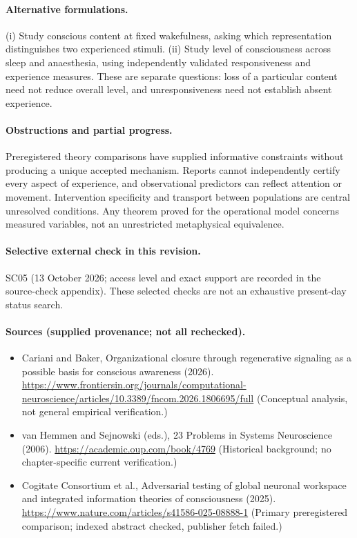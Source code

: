 \documentclass[11pt]{article}
\begin{document}
\paragraph{Alternative formulations.} (i) Study conscious content at fixed wakefulness, asking which representation distinguishes two experienced stimuli. (ii) Study level of consciousness across sleep and anaesthesia, using independently validated responsiveness and experience measures. These are separate questions: loss of a particular content need not reduce overall level, and unresponsiveness need not establish absent experience.
\paragraph{Obstructions and partial progress.} Preregistered theory comparisons have supplied informative constraints without producing a unique accepted mechanism. Reports cannot independently certify every aspect of experience, and observational predictors can reflect attention or movement. Intervention specificity and transport between populations are central unresolved conditions. Any theorem proved for the operational model concerns measured variables, not an unrestricted metaphysical equivalence.
\paragraph{Selective external check in this revision.} SC05 (13 October 2026; access level and exact support are recorded in the source-check appendix). These selected checks are not an exhaustive present-day status search.

\paragraph{Sources (supplied provenance; not all rechecked).} \begin{itemize}
\item Cariani and Baker, Organizational closure through regenerative signaling as a possible basis for conscious awareness (2026). \url{https://www.frontiersin.org/journals/computational-neuroscience/articles/10.3389/fncom.2026.1806695/full} (Conceptual analysis, not general empirical verification.)
\item van Hemmen and Sejnowski (eds.), 23 Problems in Systems Neuroscience (2006). \url{https://academic.oup.com/book/4769} (Historical background; no chapter-specific current verification.)
\item Cogitate Consortium et al., Adversarial testing of global neuronal workspace and integrated information theories of consciousness (2025). \url{https://www.nature.com/articles/s41586-025-08888-1} (Primary preregistered comparison; indexed abstract checked, publisher fetch failed.)
\end{itemize}
\end{document}

